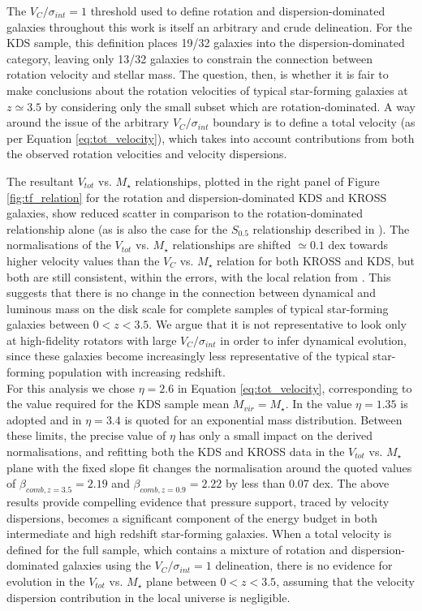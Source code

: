 \documentclass[fleqn,usenatbib]{mnras}
\begin{document}
\noindent
The $V_{C}/\sigma_{int} = 1$ threshold used to define rotation and dispersion-dominated galaxies throughout this work is itself an arbitrary and crude delineation.
For the KDS sample, this definition places 19/32 galaxies into the dispersion-dominated category, leaving only 13/32 galaxies to constrain the connection between rotation velocity and stellar mass.
The question, then, is whether it is fair to make conclusions about the rotation velocities of typical star-forming galaxies at $z\simeq3.5$ by considering only the small subset which are rotation-dominated.
A way around the issue of the arbitrary $V_{C}/\sigma_{int}$ boundary is to define a total velocity (as per Equation \ref{eq:tot_velocity}), which takes into account contributions from both the observed rotation velocities and velocity dispersions.

The resultant $V_{tot}$ vs. $M_{\star}$ relationships, plotted in the right panel of Figure \ref{fig:tf_relation} for the rotation and dispersion-dominated KDS and KROSS galaxies, show reduced scatter in comparison to the rotation-dominated relationship alone (as is also the case for the $S_{0.5}$ relationship described in \citealt{Kassin2007,Kassin2012}).
The normalisations of the $V_{tot}$ vs. $M_{\star}$ relationships are shifted $\simeq0.1$ dex towards higher velocity values than the $V_{C}$ vs. $M_{\star}$ relation for both KROSS and KDS, but both are still consistent, within the errors, with the local relation from \cite{Reyes2011}.
This suggests that there is no change in the connection between dynamical and luminous mass on the disk scale for complete samples of typical star-forming galaxies between $0 < z < 3.5$.
We argue that it is not representative to look only at high-fidelity rotators with large $V_{C}/\sigma_{int}$ in order to infer dynamical evolution, since these galaxies become increasingly less representative of the typical star-forming population with increasing redshift. \\

\noindent
For this analysis we chose $\eta=2.6$ in Equation \ref{eq:tot_velocity}, corresponding to the value required for the KDS sample mean $M_{vir} = M_{\star}$.
In \cite{Epinat2009} the value $\eta=1.35$ is adopted and in \cite{Newman2013} $\eta=3.4$ is quoted for an exponential mass distribution.
Between these limits, the precise value of $\eta$ has only a small impact on the derived normalisations, and refitting both the KDS and KROSS data in the $V_{tot}$ vs. $M_{\star}$ plane with the fixed slope fit changes the normalisation around the quoted values of $\beta_{comb,z=3.5} = 2.19$ and $\beta_{comb,z=0.9} = 2.22$ by less than 0.07 dex.
The above results provide compelling evidence that pressure support, traced by velocity dispersions, becomes a significant component of the energy budget in both intermediate and high redshift star-forming galaxies.
When a total velocity is defined for the full sample, which contains a mixture of rotation and dispersion-dominated galaxies using the $V_{C}/\sigma_{int} = 1$ delineation, there is no evidence for evolution in the $V_{tot}$ vs. $M_{\star}$ plane between $0 < z < 3.5$, assuming that the velocity dispersion contribution in the local universe is negligible.
\end{document}
